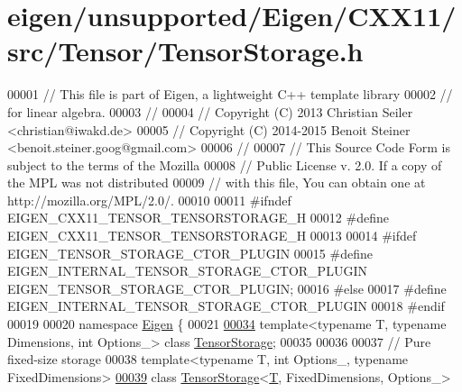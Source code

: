 \hypertarget{eigen_2unsupported_2_eigen_2_c_x_x11_2src_2_tensor_2_tensor_storage_8h_source}{}\section{eigen/unsupported/\+Eigen/\+C\+X\+X11/src/\+Tensor/\+Tensor\+Storage.h}
\label{eigen_2unsupported_2_eigen_2_c_x_x11_2src_2_tensor_2_tensor_storage_8h_source}

\begin{DoxyCode}
00001 \textcolor{comment}{// This file is part of Eigen, a lightweight C++ template library}
00002 \textcolor{comment}{// for linear algebra.}
00003 \textcolor{comment}{//}
00004 \textcolor{comment}{// Copyright (C) 2013 Christian Seiler <christian@iwakd.de>}
00005 \textcolor{comment}{// Copyright (C) 2014-2015 Benoit Steiner <benoit.steiner.goog@gmail.com>}
00006 \textcolor{comment}{//}
00007 \textcolor{comment}{// This Source Code Form is subject to the terms of the Mozilla}
00008 \textcolor{comment}{// Public License v. 2.0. If a copy of the MPL was not distributed}
00009 \textcolor{comment}{// with this file, You can obtain one at http://mozilla.org/MPL/2.0/.}
00010 
00011 \textcolor{preprocessor}{#ifndef EIGEN\_CXX11\_TENSOR\_TENSORSTORAGE\_H}
00012 \textcolor{preprocessor}{#define EIGEN\_CXX11\_TENSOR\_TENSORSTORAGE\_H}
00013 
00014 \textcolor{preprocessor}{#ifdef EIGEN\_TENSOR\_STORAGE\_CTOR\_PLUGIN}
00015 \textcolor{preprocessor}{  #define EIGEN\_INTERNAL\_TENSOR\_STORAGE\_CTOR\_PLUGIN EIGEN\_TENSOR\_STORAGE\_CTOR\_PLUGIN;}
00016 \textcolor{preprocessor}{#else}
00017 \textcolor{preprocessor}{  #define EIGEN\_INTERNAL\_TENSOR\_STORAGE\_CTOR\_PLUGIN}
00018 \textcolor{preprocessor}{#endif}
00019 
00020 \textcolor{keyword}{namespace }\hyperlink{namespace_eigen}{Eigen} \{
00021 
\hyperlink{class_eigen_1_1_tensor_storage}{00034} \textcolor{keyword}{template}<\textcolor{keyword}{typename} T, \textcolor{keyword}{typename} Dimensions, \textcolor{keywordtype}{int} Options\_> \textcolor{keyword}{class }\hyperlink{class_eigen_1_1_tensor_storage}{TensorStorage};
00035 
00036 
00037 \textcolor{comment}{// Pure fixed-size storage}
00038 \textcolor{keyword}{template}<\textcolor{keyword}{typename} T, \textcolor{keywordtype}{int} Options\_, \textcolor{keyword}{typename} FixedDimensions>
\hyperlink{class_eigen_1_1_tensor_storage_3_01_t_00_01_fixed_dimensions_00_01_options___01_4}{00039} \textcolor{keyword}{class }\hyperlink{class_eigen_1_1_tensor_storage}{TensorStorage}<\hyperlink{group___sparse_core___module}{T}, FixedDimensions, Options\_>

\end{DoxyCode}
